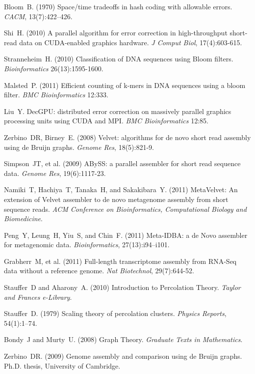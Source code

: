 \documentclass{pnastwo}
\begin{document}
\begin{article}
\begin{thebibliography}{10}
 Bloom~B. (1970) Space/time tradeoffs in hash coding with 
allowable errors. {\it CACM}, 13(7):422--426.

 Shi~H. (2010) A parallel algorithm for error correction 
in high-throughput short-read data on CUDA-enabled graphics hardware. {\it 
J Comput Biol}, 17(4):603-615.

 Stranneheim~H. (2010) Classification of DNA sequences 
using Bloom filters. {\it Bioinformatics} 26(13):1595-1600.

 Malsted~P. (2011) Efficient counting of k-mers in DNA 
sequences using a bloom filter. {\it BMC Bioinformatics} 12:333.

 Liu~Y. DecGPU: distributed error correction on 
massively parallel graphics processing units using CUDA and MPI. {\it 
BMC Bioinformatics} 12:85.

 Zerbino~DR, Birney~E. (2008) Velvet: algorithms for de novo 
short read assembly using de Bruijn graphs. {\it Genome Res}, 18(5):821-9.

 Simpson~JT, et al. (2009) ABySS: a parallel assembler for 
short read sequence data. {\it Genome Res}, 19(6):1117-23.

 Namiki~T, Hachiya~T, Tanaka~H, and Sakakibara~Y. (2011) 
MetaVelvet: An extension of Velvet assembler to de novo metagenome assembly 
from short sequence reads. {\it ACM Conference on Bioinformatics, 
Computational Biology and Biomedicine}.

 Peng~Y, Leung~H, Yiu~S, and Chin~F. (2011) Meta-IDBA: 
a de Novo assembler for metagenomic data. {\it Bioinformatics}, 
27(13):i94--i101.

 Grabherr~M, et al. (2011) Full-length transcriptome assembly 
from RNA-Seq data without a reference genome. {\it Nat Biotechnol}, 
29(7):644-52.

 Stauffer~D and Aharony~A. (2010) Introduction to 
Percolation Theory. {\it Taylor and Frances e-Library}.

 Stauffer~D. (1979) Scaling theory of 
percolation clusters. {\it Physics Reports}, 54(1):1--74.

 Bondy~J and Murty~U. (2008) Graph Theory. {\it 
Graduate Texts in Mathematics}.

 Zerbino~DR. (2009) Genome assembly and comparison 
using de Bruijn graphs. Ph.D. thesis, University of Cambridge.


\end{thebibliography}
\end{article}
\end{document}
